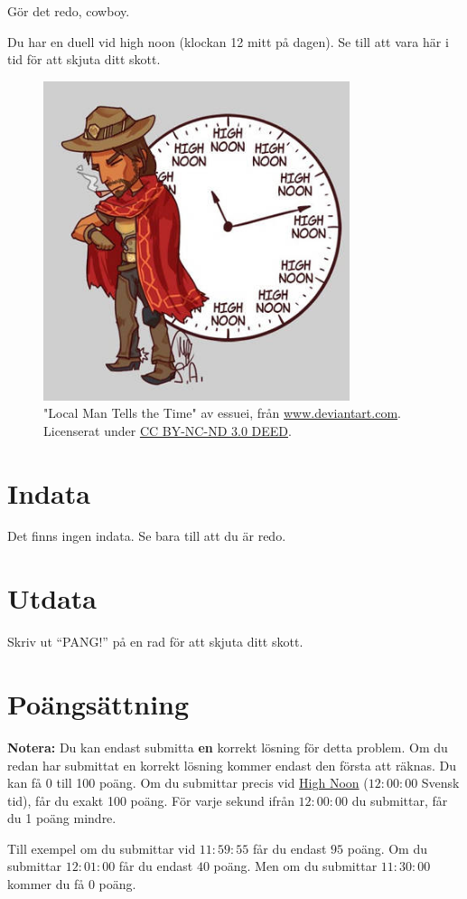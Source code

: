 
Gör det redo, cowboy. 

Du har en duell vid high noon (klockan 12 mitt på dagen). 
Se till att vara här i tid för att skjuta ditt skott.

\begin{centering}
  \begin{figure}[h]
      \centering
      \includegraphics[width=0.8\textwidth]{highnoon.jpg}
      \caption{"Local Man Tells the Time" av essuei, från \href{https://www.deviantart.com/essuei/art/Overwatch-Local-Man-Tells-the-Time-614496598}{www.deviantart.com}. Licenserat under \href{https://creativecommons.org/licenses/by-nc-nd/3.0/}{CC BY-NC-ND 3.0 DEED}.}
  \end{figure}
\end{centering}

\section*{Indata}
Det finns ingen indata. Se bara till att du är redo.

\section*{Utdata}
Skriv ut ``PANG!'' på en rad för att skjuta ditt skott.

\section*{Poängsättning}
\textbf{Notera:} Du kan endast submitta \textbf{en} korrekt lösning för detta problem. Om du redan har submittat en korrekt lösning kommer endast den första att räknas.  
Du kan få 0 till 100 poäng. Om du submittar precis vid \href{https://www.timeanddate.com/worldclock/fixedtime.html?msg=Ready+yourself%2C+Cowboy&iso=20240401T12&p1=239}{High Noon} 
($12:00:00$ Svensk tid), får du exakt 100 poäng. För varje sekund ifrån $12:00:00$ du submittar, får du 1 poäng mindre. 

Till exempel om du submittar vid $11:59:55$ får du endast $95$ poäng. Om du submittar $12:01:00$ får du endast $40$ poäng.
Men om du submittar $11:30:00$ kommer du få $0$ poäng.
